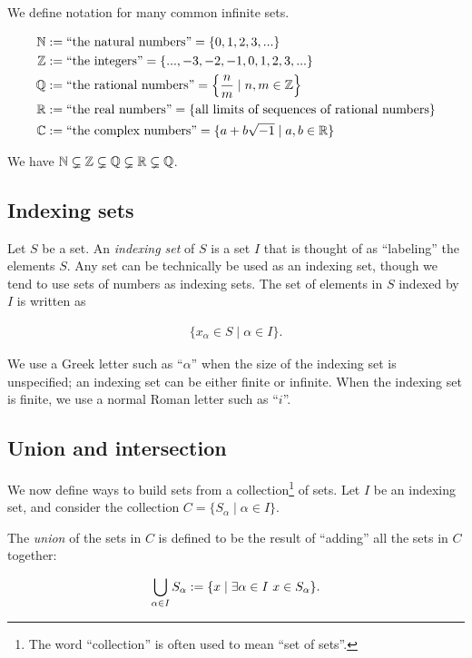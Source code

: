 We define notation for many common infinite sets.

\begin{align*}
    \mathbb{N} &:= \text{``the natural numbers''} = \{0, 1, 2, 3, ...\} \\
    \mathbb{Z} &:= \text{``the integers''} = \{..., -3, -2, -1, 0, 1, 2, 3, ... \} \\
    \mathbb{Q} &:= \text{``the rational numbers''} = \Big\{ \frac{n}{m} \mid n, m \in \mathbb{Z} \Big\} \\
    \mathbb{R} &:= \text{``the real numbers''} = \{ \text{all limits of sequences of rational numbers} \} \\
    \mathbb{C} &:= \text{``the complex numbers''} = \{ a + b \sqrt{-1} \mid a, b \in \mathbb{R} \}
\end{align*}

We have $\mathbb{N} \subsetneq \mathbb{Z} \subsetneq \mathbb{Q} \subsetneq \mathbb{R} \subsetneq \mathbb{Q}$.

\subsection*{Indexing sets}

Let $S$ be a set. An \textit{indexing set} of $S$ is a set $I$ that is thought of as ``labeling'' the elements $S$. Any set can be technically be used as an indexing set, though we tend to use sets of numbers as indexing sets. The set of elements in $S$ indexed by $I$ is written as

\begin{align*}
    \{ x_\alpha \in S \mid \alpha \in I \}.
\end{align*}

We use a Greek letter such as ``$\alpha$'' when the size of the indexing set is unspecified; an indexing set can be either finite or infinite. When the indexing set is finite, we use a normal Roman letter such as ``$i$''.

\subsection*{Union and intersection}

We now define ways to build sets from a collection\footnote{The word ``collection'' is often used to mean ``set of sets''.} of sets. Let $I$ be an indexing set, and consider the collection $C = \{S_\alpha \mid \alpha \in I \}$.

The \textit{union} of the sets in $C$ is defined to be the result of ``adding'' all the sets in $C$ together:

\begin{align*}
    \bigcup_{\alpha \in I} S_\alpha := \{ x \mid \exists \alpha \in I \text{ } x \in S_\alpha \}.
\end{align*}

